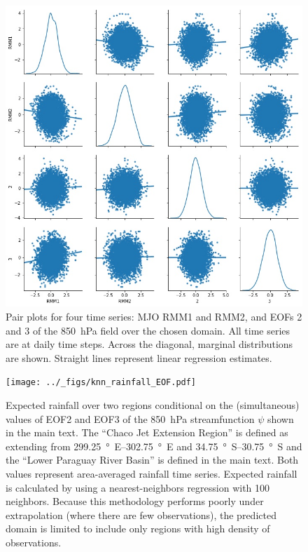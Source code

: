 \documentclass{article}
\begin{document}
\begin{figure}
  \includegraphics[width=\textwidth]{../_figs/MJO_EOF_Scatter}
	\caption{
		Pair plots for four time series: MJO RMM1 and RMM2, and EOFs 2 and 3 of the \SI{850}{\hecto\pascal} field over the chosen domain.
    All time series are at daily time steps.
    Across the diagonal, marginal distributions are shown.
    Straight lines represent linear regression estimates.
	}
\end{figure}

\begin{figure}
  \texttt{[image: ../\_figs/knn\_rainfall\_EOF.pdf]}
	\caption{
    Expected rainfall over two regions conditional on the (simultaneous) values of EOF2 and EOF3 of the \SI{850}{\hecto\pascal} streamfunction $\psi$ shown in the main text.
    The ``Chaco Jet Extension Region'' is defined as extending from \SIrange{299.25}{302.75}{\degree E} and \SIrange{34.75}{30.75}{\degree S} and the ``Lower Paraguay River Basin'' is defined in the main text.
    Both values represent area-averaged rainfall time series.
    Expected rainfall is calculated by using a nearest-neighbors regression with 100 neighbors.
    Because this methodology performs poorly under extrapolation (where there are few observations), the predicted domain is limited to include only regions with high density of observations.
    }
\end{figure}
\end{document}
